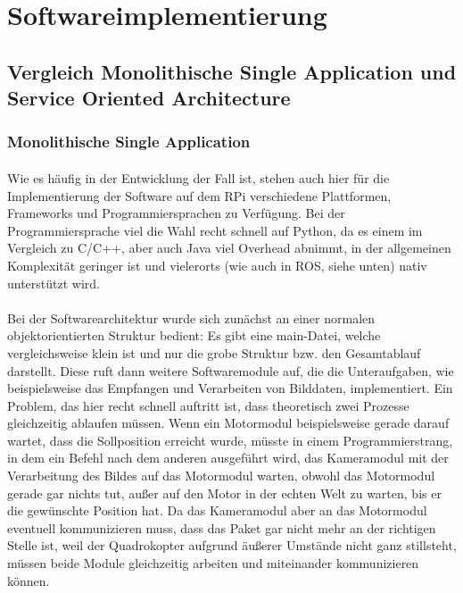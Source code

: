 \section{Softwareimplementierung}
\paragraph{}
\subsection{Vergleich Monolithische Single Application und Service Oriented Architecture}
\subsubsection{Monolithische Single Application}
\paragraph{}
Wie es häufig in der Entwicklung der Fall ist, stehen auch hier für die Implementierung
der Software auf dem RPi verschiedene Plattformen, Frameworks und
Programmiersprachen zu Verfügung. Bei der Programmiersprache viel die Wahl recht
schnell auf Python, da es einem im Vergleich zu C/C++, aber auch Java viel Overhead
abnimmt, in der allgemeinen Komplexität geringer ist und vielerorts (wie auch in ROS,
siehe unten) nativ unterstützt wird.
\paragraph{}
Bei der Softwarearchitektur wurde sich zunächst an einer normalen objektorientierten Struktur bedient: Es gibt eine main-Datei, welche vergleichsweise
klein ist und nur die grobe Struktur bzw. den Gesamtablauf darstellt. Diese ruft dann weitere Softwaremodule auf, die die Unteraufgaben, wie beispielsweise das Empfangen und Verarbeiten von Bilddaten, implementiert. Ein Problem, das hier recht schnell auftritt ist, dass theoretisch zwei Prozesse gleichzeitig ablaufen müssen. Wenn ein Motormodul beispielsweise gerade darauf wartet, dass die Sollposition erreicht wurde, müsste in einem Programmierstrang, in dem ein Befehl nach dem anderen ausgeführt wird, das Kameramodul mit der Verarbeitung des Bildes auf das Motormodul warten, obwohl das Motormodul gerade gar nichts tut, außer auf den
Motor in der echten Welt zu warten, bis er die gewünschte Position hat. Da das Kameramodul aber an das Motormodul eventuell kommunizieren muss, dass das
Paket gar nicht mehr an der richtigen Stelle ist, weil der Quadrokopter aufgrund äußerer Umstände nicht ganz stillsteht, müssen beide Module gleichzeitig arbeiten und
miteinander kommunizieren können. 
